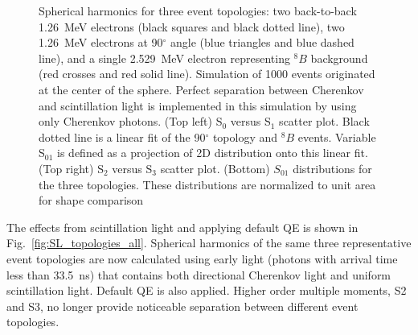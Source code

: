 \documentclass[12pt,twoside,letterpaper]{article}
\newcommand{\B}{^{8}B}
\begin{document}
\begin{figure}[htb]
\caption{Spherical harmonics for three event topologies: two back-to-back 1.26~MeV electrons (black squares and black dotted line), two 1.26~MeV electrons at 90$^{\circ}$ angle (blue triangles and blue dashed line), and a single 2.529~MeV electron representing $\B$ background (red crosses and red solid line). Simulation of 1000 events originated at the center of the sphere. Perfect separation between Cherenkov and scintillation light is implemented in this simulation by using only Cherenkov photons. (Top left) S$_0$ versus S$_1$ scatter plot. Black dotted line is a linear fit of the 90$^{\circ}$ topology and $\B$ events. Variable S$_{01}$ is defined as a projection of 2D distribution onto this linear fit. (Top right) S$_2$ versus S$_3$ scatter plot. (Bottom) $S_{01}$ distributions for the three topologies. These distributions are normalized to unit area for shape comparison}
\label{fig:SL_topologies_CHE}
\end{figure}


The effects from scintillation light and applying default QE is shown in Fig.~\ref{fig:SL_topologies_all}. Spherical harmonics of the same three representative event topologies are now calculated using early light (photons with arrival time less than 33.5~ns) that contains both directional Cherenkov light and uniform scintillation light. Default QE is also applied. Higher order multiple moments, S2 and S3, no longer provide noticeable separation between different event topologies.
\end{document}
